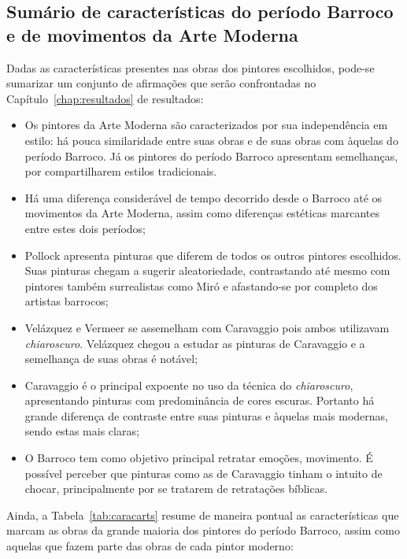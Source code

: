 \subsection{Sumário de características do período Barroco e de movimentos da Arte Moderna}
\label{subsec:sumario}

Dadas as características presentes nas obras dos pintores escolhidos,
pode-se sumarizar um conjunto de afirmações que serão
confrontadas no Capítulo~\ref{chap:resultados} de resultados:

\begin{itemize}
\item Os pintores da Arte Moderna são caracterizados por sua
  independência em estilo: há pouca similaridade entre suas obras e de
  suas obras com àquelas do período Barroco. Já os pintores do período
  Barroco apresentam semelhanças, por compartilharem estilos
  tradicionais.

\item Há uma diferença considerável de tempo decorrido desde o Barroco
  até os movimentos da Arte Moderna, assim como diferenças estéticas
  marcantes entre estes dois períodos;

\item Pollock apresenta pinturas que diferem de todos os outros
  pintores escolhidos. Suas pinturas chegam a sugerir aleatoriedade,
  contrastando até mesmo com pintores também surrealistas como Miró e
  afastando-se por completo dos artistas barrocos;

\item Velázquez e Vermeer se assemelham com Caravaggio pois ambos
  utilizavam \textit{chiaroscuro}. Velázquez chegou a estudar as
  pinturas de Caravaggio e a semelhança de suas obras é notável;

\item Caravaggio é o principal expoente no uso da técnica do
  \textit{chiaroscuro}, apresentando pinturas com predominância de
  cores escuras. Portanto há grande diferença de contraste entre suas
  pinturas e àquelas mais modernas, sendo estas mais claras;

\item O Barroco tem como objetivo principal retratar emoções,
  movimento. É possível perceber que pinturas como as de Caravaggio
  tinham o intuito de chocar, principalmente por se tratarem de
  retratações bíblicas.
\end{itemize}

Ainda, a Tabela~\ref{tab:caracarts} resume de maneira pontual as características que marcam as obras da grande maioria dos pintores do período Barroco, assim como aquelas que fazem parte das obras de cada pintor moderno:

